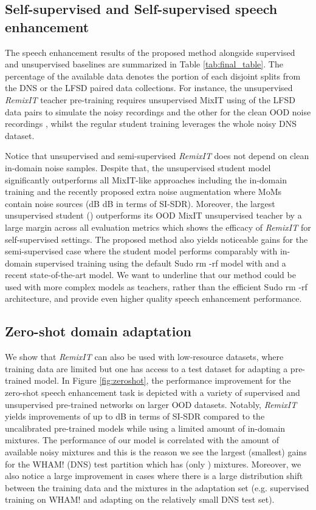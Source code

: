 \documentclass{article}
\begin{document}
\subsection{Self-supervised and Self-supervised speech enhancement}
\label{sec:results:self_sup}
The speech enhancement results of the proposed method alongside supervised and unsupervised baselines are summarized in Table \ref{tab:final_table}. The percentage of the available data denotes the portion of each disjoint splits from the DNS or the LFSD paired data collections. For instance, the unsupervised \textit{RemixIT} teacher pre-training requires unsupervised MixIT using  of the LFSD data pairs to simulate the noisy recordings  and the other  for the clean OOD noise recordings , whilst the regular student training leverages the whole noisy DNS dataset. 


Notice that unsupervised and semi-supervised \textit{RemixIT} does not depend on clean in-domain noise samples. Despite that, the unsupervised student model significantly outperforms all MixIT-like approaches including the in-domain training and the recently proposed extra noise augmentation where MoMs contain  noise sources \cite{saito2021trainingSEsystemsWNoisyDatasets} (dB dB in terms of SI-SDR). Moreover, the largest unsupervised student () outperforms its OOD MixIT unsupervised teacher by a large margin across all evaluation metrics which shows the efficacy of \textit{RemixIT} for self-supervised settings. The proposed method also yields noticeable gains for the semi-supervised case where the student model performs comparably with in-domain supervised training using the default Sudo rm -rf model with  and a recent state-of-the-art model. We want to underline that our method could be used with more complex models as teachers, rather than the efficient Sudo rm -rf architecture, and provide even higher quality speech enhancement performance.




\subsection{Zero-shot domain adaptation}
\label{sec:results:zero_shot}
We show that \textit{RemixIT} can also be used with low-resource datasets, where training data are limited but one has access to a test dataset for adapting a pre-trained model. In Figure \ref{fig:zeroshot}, the performance improvement for the zero-shot speech enhancement task is depicted with a variety of supervised and unsupervised pre-trained networks on larger OOD datasets. Notably, \textit{RemixIT} yields improvements of up to dB in terms of SI-SDR compared to the uncalibrated pre-trained models while using a limited amount of in-domain mixtures. The performance of our model is correlated with the amount of available noisy mixtures and this is the reason we see the largest (smallest) gains for the WHAM! (DNS) test partition which has  (only ) mixtures. Moreover, we also notice a large improvement in cases where there is a large distribution shift between the training data and the mixtures in the adaptation set (e.g. supervised training on WHAM! and adapting on the relatively small DNS test set).
\end{document}
